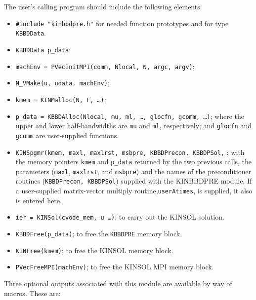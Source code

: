 \documentclass[11pt]{article}
\begin{document}
The user's calling program should include the following elements:

\begin{itemize}
\item  {\tt \#include "kinbbdpre.h"} for needed function prototypes and for
type {\tt KBBDData}.

\item  {\tt KBBDData p\_data};

\item  {\tt machEnv = PVecInitMPI(comm, Nlocal, N, argc, argv)};

\item  {\tt N\_VMake(u, udata, machEnv)};

\item  {\tt kmem = KINMalloc(N, F, \ldots )};

\item  {\tt p\_data = KBBDAlloc(Nlocal, mu, ml, \ldots, glocfn, gcomm, \ldots)};
where the 
\newline upper and lower half-bandwidths are {\tt mu} and {\tt ml},
respectively; and {\tt glocfn} and {\tt gcomm} are user-supplied
functions.

\item  {\tt KINSpgmr(kmem, maxl, maxlrst, msbpre, KBBDPrecon, KBBDPSol,}
; with the memory pointers 
{\tt kmem} and {\tt p\_data} returned by the two previous calls,
the parameters ({\tt maxl}, {\tt maxlrst}, and {\tt msbpre}) and the
names of the preconditioner routines ({\tt KBBDPrecon, KBBDPSol})
supplied with the KINBBDPRE module. If a user-supplied matrix-vector multiply
routine,{\tt userAtimes}, is supplied, it also is entered here.

\item  {\tt ier = KINSol(cvode\_mem, u \ldots )}; to carry out the
KINSOL solution.

\item  {\tt KBBDFree(p\_data)}; to free the {\tt KBBDPRE} memory block.

\item  {\tt KINFree(kmem)}; to free the KINSOL memory block.

\item  {\tt PVecFreeMPI(machEnv)}; to free the KINSOL MPI memory block.
\end{itemize}

Three optional outputs associated with this module are available by way of
macros. These are:
\end{document}
